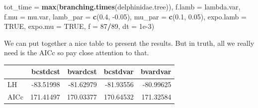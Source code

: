 \documentclass[
]{book}
\newenvironment{Shaded}{\begin{snugshade}}{\end{snugshade}}
\newcommand{\DataTypeTok}[1]{\textcolor[rgb]{0.13,0.29,0.53}{#1}}
\newcommand{\DecValTok}[1]{\textcolor[rgb]{0.00,0.00,0.81}{#1}}
\newcommand{\FloatTok}[1]{\textcolor[rgb]{0.00,0.00,0.81}{#1}}
\newcommand{\KeywordTok}[1]{\textcolor[rgb]{0.13,0.29,0.53}{\textbf{#1}}}
\newcommand{\NormalTok}[1]{#1}
\newcommand{\OperatorTok}[1]{\textcolor[rgb]{0.81,0.36,0.00}{\textbf{#1}}}
\newcommand{\OtherTok}[1]{\textcolor[rgb]{0.56,0.35,0.01}{#1}}
\newcommand{\StringTok}[1]{\textcolor[rgb]{0.31,0.60,0.02}{#1}}
\begin{document}
\begin{Shaded}
\begin{Highlighting}[]
                   \DataTypeTok{tot\_time =} \KeywordTok{max}\NormalTok{(}\KeywordTok{branching.times}\NormalTok{(delphinidae.tree)),}
                   \DataTypeTok{f.lamb =}\NormalTok{ lambda.var, }\DataTypeTok{f.mu =}\NormalTok{ mu.var,}
                   \DataTypeTok{lamb\_par =} \KeywordTok{c}\NormalTok{(}\FloatTok{0.4}\NormalTok{, }\FloatTok{{-}0.05}\NormalTok{), }\DataTypeTok{mu\_par =} \KeywordTok{c}\NormalTok{(}\FloatTok{0.1}\NormalTok{, }\FloatTok{0.05}\NormalTok{),}
                   \DataTypeTok{expo.lamb =} \OtherTok{TRUE}\NormalTok{, }\DataTypeTok{expo.mu =} \OtherTok{TRUE}\NormalTok{, }
                   \DataTypeTok{f =} \DecValTok{87}\OperatorTok{/}\DecValTok{89}\NormalTok{, }\DataTypeTok{dt =} \FloatTok{1e{-}3}\NormalTok{)}
\end{Highlighting}
\end{Shaded}

We can put together a nice table to present the results. But in truth, all we really need is the AICc so pay close attention to that.

\begin{Shaded}
\end{Shaded}

\begin{tabular}{l|r|r|r|r}
\hline
  & bcstdcst & bvardcst & bcstdvar & bvardvar\\
\hline
LH & -83.51998 & -81.62979 & -81.93556 & -80.99625\\
\hline
AICc & 171.41497 & 170.03377 & 170.64532 & 171.32584\\
\hline
\end{tabular}
\end{document}
